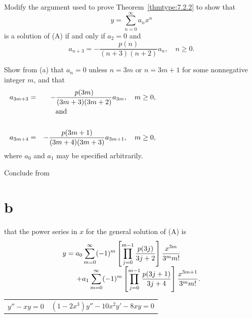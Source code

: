 \begin{exerciselist}
  \begin{alist}
    \item %
    Modify the argument used to prove Theorem~\ref{thmtype:7.2.2} to show that
    \[
      y=\sum_{n=0}^{\infty}a_{n}x^{n}
    \]
    is a solution of (A) if and only if $a_{2}=0$ and
    \[
      a_{n+3}=-\frac{p(n)}{(n+3)(n+2)}a_{n},\quad n\ge0.
    \]

    \item %
    Show from (a) that $a_{n}=0$ unless $n=3m$ or $n=3m+1$ for some nonnegative integer $m$, and
    that
    \begin{eqnarray*}
      a_{3m+3}                           & = & -\frac{p(3m)}{(3m+3)(3m+2)}a_{3m},\quad m\ge0, \\
      \noalign{\hspace*{50pt}\mbox{and}}                                                      \\
      a_{3m+4}                           & = & -\frac{p(3m+1)}{(3m+4)(3m+3)}a_{3m+1},\quad m\ge0,
    \end{eqnarray*}
    where $a_{0}$ and $a_{1}$ may be specified arbitrarily.

    \item %
    Conclude from \part{b} that the power series in $x$ for the general solution of (A) is
    \[
      \begin{array}{l}
        y=\displaystyle{a_{0}\sum^{\infty}_{m=0}(-1)^{m}\left[\prod^{m-1}_{j=0} \frac{p(3j)}{3j+2}\right]{\frac{x^{3m}}{3^{m}m!}}}            \\[2\jot]
        \qquad\displaystyle{+a_{1}\sum^{\infty}_{m=0}(-1)^{m} \left[\prod^{m-1}_{j=0}\frac{p(3j+1)}{3j+4}\right] {\frac{x^{3m+1}}{3^{m}m!}}}.
      \end{array}
    \]
  \end{alist}


  \begin{tabular}[t]{@{}p{100pt}@{}p{168pt}}
    \item\label{exer:7.2.33} $y''-xy=0$ & \vspace*{10pt}
    \item\label{exer:7.2.34} $(1-2x^{3})y''-10x^{2}y'-8xy=0$
  \end{tabular}


\end{exerciselist}
